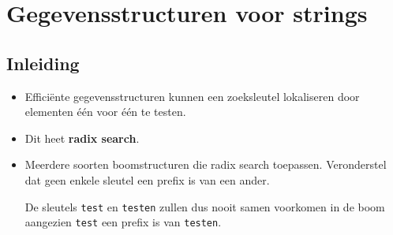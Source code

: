 \chapter{Gegevensstructuren voor strings}
\section{Inleiding}
\begin{itemize}
    \item Efficiënte gegevensstructuren kunnen een zoeksleutel lokaliseren door elementen één voor één te testen.
    \item Dit heet \textbf{radix search}.
    \item Meerdere soorten boomstructuren die radix search toepassen.
    \alert Veronderstel dat geen enkele sleutel een prefix is van een ander.

    De sleutels \texttt{test} en \texttt{testen} zullen dus nooit samen voorkomen in de boom aangezien \texttt{test} een prefix is van \texttt{testen}.
\end{itemize}

